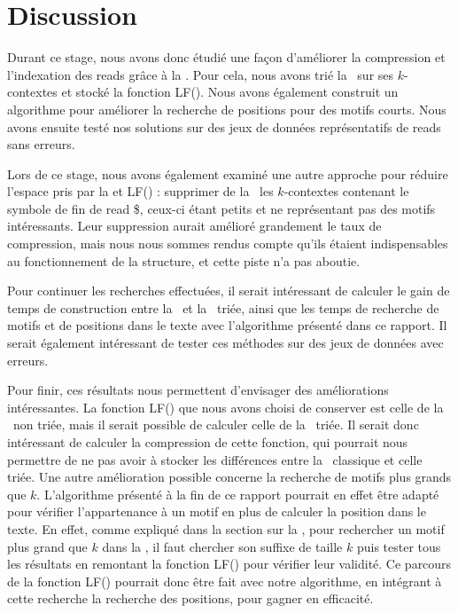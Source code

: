 \section*{Discussion}

Durant ce stage, nous avons donc étudié une façon d'améliorer la compression et l'indexation des reads grâce à la \kbwt. Pour cela, nous avons trié la \kbwt\ sur ses $k$-contextes et stocké la fonction LF(). Nous avons également construit un algorithme pour améliorer la recherche de positions pour des motifs courts. Nous avons ensuite testé nos solutions sur des jeux de données représentatifs de reads sans erreurs.

Lors de ce stage, nous avons également examiné une autre approche pour réduire l'espace pris par la \kbwt et LF() : supprimer de la \kbwt\ les $k$-contextes contenant le symbole de fin de read \$, ceux-ci étant petits et ne représentant pas des motifs intéressants. Leur suppression aurait amélioré grandement le taux de compression, mais nous nous sommes rendus compte qu'ils étaient indispensables au fonctionnement de la structure, et cette piste n'a pas aboutie.

Pour continuer les recherches effectuées, il serait intéressant de calculer le gain de temps de construction entre la \bwt\ et la \kbwt\ triée, ainsi que les temps de recherche de motifs et de positions dans le texte avec l'algorithme présenté dans ce rapport. Il serait également intéressant de tester ces méthodes sur des jeux de données avec erreurs.

Pour finir, ces résultats nous permettent d'envisager des améliorations intéressantes. La fonction LF() que nous avons choisi de conserver est celle de la \kbwt\ non triée, mais il serait possible de calculer celle de la \kbwt\ triée. Il serait donc intéressant de calculer la compression de cette fonction, qui pourrait nous permettre de ne pas avoir à stocker les différences entre la \kbwt\ classique et celle triée. Une autre amélioration possible concerne la recherche de motifs plus grands que $k$. L'algorithme présenté à la fin de ce rapport pourrait en effet être adapté pour vérifier l'appartenance à un motif en plus de calculer la position dans le texte. En effet, comme expliqué dans la section sur la \kbwt, pour rechercher un motif plus grand que $k$ dans la \kbwt, il faut chercher son suffixe de taille $k$ puis tester tous les résultats en remontant la fonction LF() pour vérifier leur validité. Ce parcours de la fonction LF() pourrait donc être fait avec notre algorithme, en intégrant à cette recherche la recherche des positions, pour gagner en efficacité.

